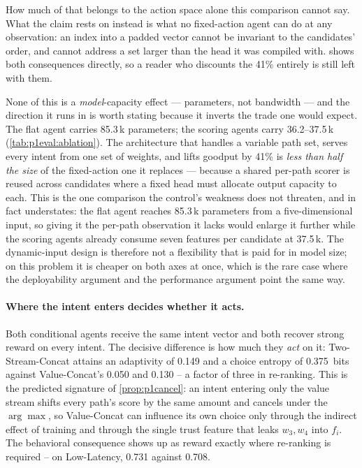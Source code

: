 How much of that belongs to the action space alone this comparison cannot say. What the claim rests on
instead is what no fixed-action agent can do at any observation: an index into a padded vector cannot be
invariant to the candidates' order, and cannot address a set larger than the head it was compiled with.
 shows both consequences directly, so a reader who discounts the 41\% entirely
is still left with them.

None of this is a \emph{model}-capacity effect --- parameters, not bandwidth --- and the direction it runs
in is worth stating because it inverts the trade one would expect. The flat agent carries 85.3\,k parameters; the scoring agents carry
36.2--37.5\,k (\cref{tab:p1eval:ablation}). The architecture that handles a variable path set, serves
every intent from one set of weights, and lifts goodput by 41\% is \emph{less than half the size} of
the fixed-action one it replaces --- because a shared per-path scorer is reused across candidates
where a fixed head must allocate output capacity to each. This is the one comparison the control's
weakness does not threaten, and in fact understates: the flat agent reaches 85.3\,k parameters from a
five-dimensional input, so giving it the per-path observation it lacks would enlarge it further while
the scoring agents already consume seven features per candidate at 37.5\,k. The dynamic-input design is
therefore not a flexibility that is paid for in model size; on this problem it is cheaper on both axes at
once, which is the rare case where the deployability argument and the performance argument point the same
way.

\paragraph{Where the intent enters decides whether it acts.} Both conditional agents receive the same
intent vector and both recover strong reward on every intent. The decisive difference is how much they
\emph{act} on it: Two-Stream-Concat attains an adaptivity of 0.149 and a choice entropy of 0.375~bits
against Value-Concat's 0.050 and 0.130 -- a factor of three in re-ranking. This is the predicted
signature of \cref{prop:p1cancel}: an intent entering only the value stream shifts every path's score by
the same amount and cancels under the $\arg\max$, so Value-Concat can influence its own choice only
through the indirect effect of training and through the single trust feature that leaks $w_3, w_4$ into
$f_i$. The behavioral consequence shows up as reward exactly where re-ranking is required -- on
Low-Latency, 0.731 against 0.708.

